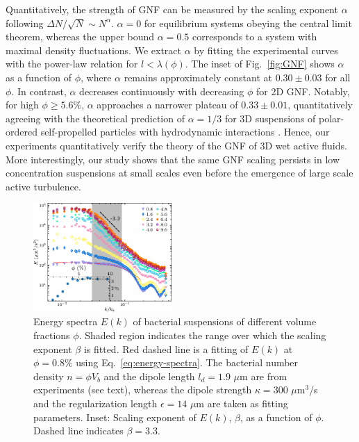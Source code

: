 \documentclass[twocolumn,aps,prx,amsmath,amssymb,longbibliography]{revtex4-2}
\begin{document}
Quantitatively, the strength of GNF can be measured by the scaling exponent $\alpha$ following $\Delta N/\sqrt{N} \sim N^\alpha$. $\alpha=0$ for equilibrium systems obeying the central limit theorem, whereas the upper bound $\alpha = 0.5$ corresponds to a system with maximal density fluctuations.
We extract $\alpha$ by fitting the experimental curves with the power-law relation for $l < \lambda(\phi)$. The inset of Fig.~\ref{fig:GNF} shows $\alpha$ as a function of $\phi$, where $\alpha$ remains approximately constant at $0.30 \pm 0.03$ for all $\phi$. In contrast, $\alpha$ decreases continuously with decreasing $\phi$ for 2D GNF. Notably, for high $\phi \geq 5.6\%$, $\alpha$ approaches a narrower plateau of $0.33 \pm 0.01$, quantitatively agreeing with the theoretical prediction of $\alpha = 1/3$ for 3D suspensions of polar-ordered self-propelled particles with hydrodynamic interactions \cite{AditiSimha2002}. Hence, our experiments quantitatively verify the theory of the GNF of 3D wet active fluids. More interestingly, our study shows that the same GNF scaling persists in low concentration suspensions at small scales even before the emergence of large scale active turbulence.

\begin{figure}[t]
\begin{center}\includegraphics[width=0.47\textwidth]{Figures/energy-spectra/v5.pdf}
\caption[Concentration dependence of energy spectra.]
{
Energy spectra $E(k)$ of bacterial suspensions of different volume fractions $\phi$. Shaded region indicates the range over which the scaling exponent $\beta$ is fitted. Red dashed line is a fitting of $E(k)$ at $\phi=0.8\%$ using Eq.~\ref{eq:energy-spectra}. The bacterial number density $n=\phi V_b$ and the dipole length $l_d = 1.9$ $\mu$m are from experiments (see text), whereas the dipole strength $\kappa = 300$ $\mu$m$^3$/s and the regularization length $\epsilon = 14$ $\mu$m are taken as fitting parameters.
Inset: Scaling exponent of $E(k)$, $\beta$, as a function of $\phi$. Dashed line indicates $\beta = 3.3$.
}
\label{fig:energy-spectra}
\end{center}
\end{figure}
\end{document}
